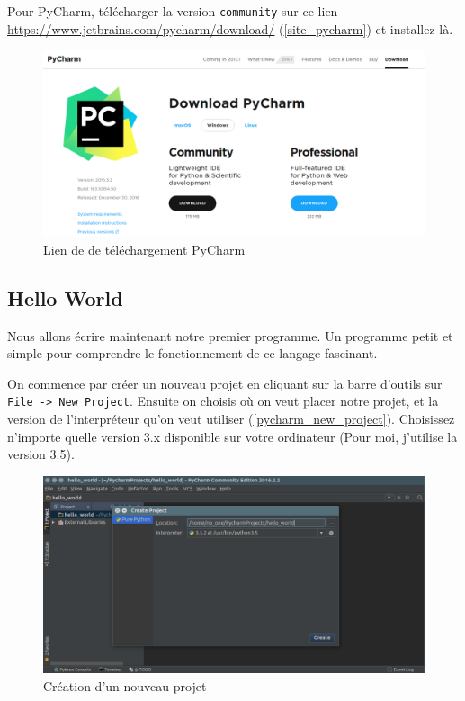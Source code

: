 \documentclass[12pt]{article}
\newcommand{\code}[1]{\colorbox{light-gray}{\texttt{#1}}}
\begin{document}
            Pour PyCharm, télécharger la version \code{community} sur ce lien \href{https://www.jetbrains.com/pycharm/download/}{https://www.jetbrains.com/pycharm/download/} (\autoref{site_pycharm}) et installez là.

            \begin{figure}[H]
                \centering
                \includegraphics[width=\linewidth]{img/8_pycharm_download.png}
                \caption{Lien de de téléchargement PyCharm}
                \label{site_pycharm}
            \end{figure}

\clearpage

    \subsection{Hello World}
        Nous allons écrire maintenant notre premier programme. Un programme petit et simple pour comprendre le
        fonctionnement de ce langage fascinant.

        On commence par créer un nouveau projet en cliquant sur la barre d'outils sur \code{File -> New Project}. Ensuite on choisis où on veut placer notre projet, et la version de l'interpréteur qu'on veut utiliser
        (\autoref{pycharm_new_project}). Choisissez n'importe quelle version 3.x disponible sur votre ordinateur
        (Pour moi, j'utilise la version 3.5).

        \begin{figure}[H]
            \centering
            \includegraphics[width=\linewidth]{img/9_new_project.png}
            \caption{Création d'un nouveau projet}
            \label{pycharm_new_project}
        \end{figure}
\end{document}
